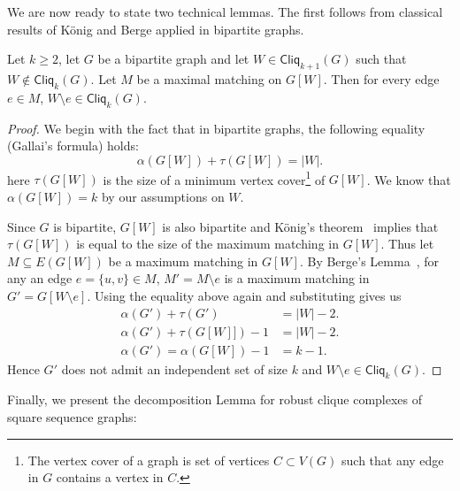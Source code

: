 \documentclass[a4paper, v2021]{lipics-v2021}
\theoremstyle{plain}
\theoremstyle{definition}
\newcommand{\Cliq}[2]{\mathsf{Cliq}_{#1}(#2)}
\begin{document}

We are now ready to state two technical lemmas. The first follows from classical results of König and Berge applied in bipartite graphs.
\begin{lemma}\label{l:edge_removal}
Let $k \geq 2$, let $G$ be a bipartite graph and let $W \in \Cliq{k+1}{G}$ such that $W \not\in \Cliq{k}{G}$. Let $M$ be a maximal matching on $G[W]$. Then for every edge $e \in M$, $W \setminus e \in \Cliq{k}{G}$.
\end{lemma}
\begin{proof}
We begin with the fact that in bipartite graphs, the following equality (Gallai's formula) holds: 
\[
\alpha(G[W]) + \tau(G[W]) = |W|.
\]
here $\tau(G[W])$ is the size of a minimum vertex cover\footnote{The vertex cover of a graph is set of vertices $C \subset V(G)$ such that any edge in $G$ contains a vertex in $C$.} of $G[W]$. We know that $\alpha(G[W]) = k$ by our assumptions on $W$.

Since $G$ is bipartite, $G[W]$ is also bipartite and König's theorem~\cite{konig1916} implies that $\tau(G[W])$ is equal to the size of the maximum matching in $G[W]$. Thus let $M \subseteq E(G[W])$ be a maximum matching in $G[W]$. By Berge's Lemma~\cite{berge1957}, for any an edge $e = \{u,v\} \in M$, $M' = M \setminus e$ is a maximum matching in $G' = G[W \setminus e]$. Using the equality above again and substituting gives us
\begin{align*}
\alpha(G') + \tau(G') &= |W| - 2. \\
\alpha(G') + \tau(G[W]]) - 1 &= |W| - 2. \\
\alpha(G') = \alpha(G[W]) - 1 &= k-1.
\end{align*}
Hence $G'$ does not admit an independent set of size $k$ and $W \setminus e  \in \Cliq{k}{G}$.
\end{proof}

Finally, we present the decomposition Lemma for robust clique complexes of square sequence graphs:
\end{document}
